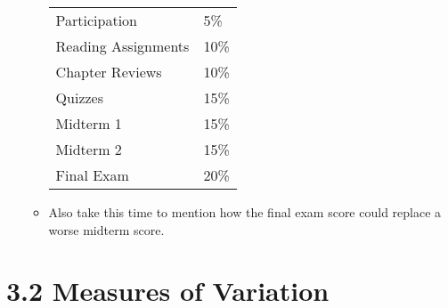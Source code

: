 \documentclass{article}
\begin{document}
\begin{enumerate}
\begin{itemize}
            \begin{center}
            \begin{tabular}{ll}
            Participation & 5\% \\
            Reading Assignments & 10\% \\
            Chapter Reviews & 10\% \\
            Quizzes & 15\% \\
            Midterm 1 & 15\% \\
            Midterm 2 & 15\% \\
            Final Exam & 20\% \\
            \end{tabular}
            \end{center}
            
            \item Also take this time to mention how the final exam score could replace a worse midterm score.
            
        \end{itemize}
        
\end{enumerate}
        
        

\section*{3.2  Measures of Variation}
\end{document}
